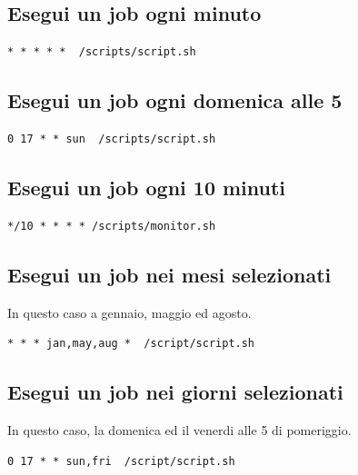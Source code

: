 \documentclass[a4paper]{report}
\newenvironment{code}{\begin{tcolorbox}[size=small]}{\end{tcolorbox}}
\begin{document}
\subsection{Esegui un job ogni minuto}
\begin{code}
	\begin{lstlisting}
* * * * *  /scripts/script.sh
	\end{lstlisting}
\end{code}


\subsection{Esegui un job ogni domenica alle 5}
\begin{code}
	\begin{lstlisting}
0 17 * * sun  /scripts/script.sh
	\end{lstlisting}
\end{code}

\subsection{Esegui un job ogni 10 minuti}
\begin{code}
	\begin{lstlisting}
*/10 * * * * /scripts/monitor.sh
	\end{lstlisting}
\end{code}

\subsection{Esegui un job nei mesi selezionati}
In questo caso a gennaio, maggio ed agosto.
\begin{code}
	\begin{lstlisting}              
* * * jan,may,aug *  /script/script.sh
	\end{lstlisting}
\end{code}

\subsection{Esegui un job nei giorni selezionati}
In questo caso, la domenica ed il venerdi alle 5 di pomeriggio.
\begin{code}
	\begin{lstlisting}              
0 17 * * sun,fri  /script/script.sh
	\end{lstlisting}
\end{code}
\end{document}

